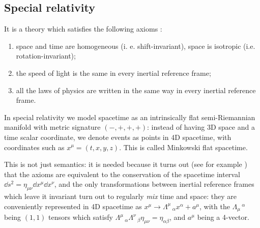 \documentclass[main.tex]{subfiles}
\begin{document}
%
%
%
%
%

\subsection{Special relativity}

It is a theory which satisfies the following axioms \cite[]{Lechner:2014}:

\begin{enumerate}
    \item space and time are homogeneous (i. e. shift-invariant), space is isotropic (i.e. rotation-invariant);
    \item the speed of light is the same in every inertial reference frame;
    \item all the laws of physics are written in the same way in every inertial reference frame.
\end{enumerate}

In special relativity we model spacetime as an intrinsically flat semi-Riemannian manifold with metric signature \((-, +, +, +)\): instead of having 3D space and a time scalar coordinate, we denote events as points in 4D spacetime, with coordinates such as \(x^\mu = (t, x, y, z)\). This is called Minkowski flat spacetime.

This is not just semantics: it is needed because it turns out (see for example \cite[section 1]{Lechner:2014}) that the axioms are equivalent to the conservation of the spacetime interval \(\dd{s}^2 = \eta_{\mu\nu} \dd{x}^\mu\dd{x}^\nu\), and the only transformations between inertial reference frames which leave it invariant turn out to regularly \emph{mix} time and space: they are conveniently represented in 4D spacetime as \(x^\mu \rightarrow \Lambda^\mu\,_\alpha x^\alpha + a^\mu\), with the \(\Lambda_\mu\,^\alpha\) being \((1,1)\) tensors which satisfy \(\Lambda^\mu\,_\alpha \Lambda^\nu\,_\beta \eta_{\mu\nu} = \eta_{\alpha \beta}\), and \(a^\mu\) being a 4-vector.
\end{document}
